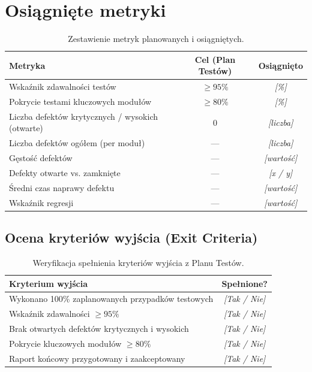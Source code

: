 \documentclass[11pt,a4paper]{article}
\newcommand{\luka}[1]{\colorbox{lukacol}{\,\textit{[#1]}\,}}
\begin{document}
\section{Osiągnięte metryki}

\begin{table}[h]
\centering
\begin{tabularx}{\textwidth}{Y c c}
\toprule
\textbf{Metryka} & \textbf{Cel (Plan Testów)} & \textbf{Osiągnięto} \\
\midrule
Wskaźnik zdawalności testów & $\geq 95\%$ & \luka{\%} \\
Pokrycie testami kluczowych modułów & $\geq 80\%$ & \luka{\%} \\
Liczba defektów krytycznych / wysokich (otwarte) & $0$ & \luka{liczba} \\
Liczba defektów ogółem (per moduł) & --- & \luka{liczba} \\
Gęstość defektów & --- & \luka{wartość} \\
Defekty otwarte vs. zamknięte & --- & \luka{x / y} \\
Średni czas naprawy defektu & --- & \luka{wartość} \\
Wskaźnik regresji & --- & \luka{wartość} \\
\bottomrule
\end{tabularx}
\caption{Zestawienie metryk planowanych i osiągniętych.}
\end{table}

\subsection{Ocena kryteriów wyjścia (Exit Criteria)}
\begin{table}[h]
\centering
\begin{tabularx}{\textwidth}{Y c}
\toprule
\textbf{Kryterium wyjścia} & \textbf{Spełnione?} \\
\midrule
Wykonano 100\% zaplanowanych przypadków testowych & \luka{Tak / Nie} \\
Wskaźnik zdawalności $\geq 95\%$ & \luka{Tak / Nie} \\
Brak otwartych defektów krytycznych i wysokich & \luka{Tak / Nie} \\
Pokrycie kluczowych modułów $\geq 80\%$ & \luka{Tak / Nie} \\
Raport końcowy przygotowany i zaakceptowany & \luka{Tak / Nie} \\
\bottomrule
\end{tabularx}
\caption{Weryfikacja spełnienia kryteriów wyjścia z Planu Testów.}
\end{table}
\end{document}

